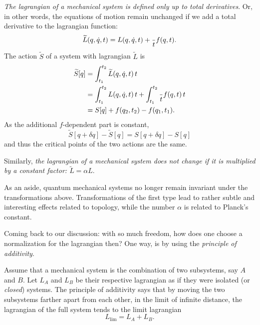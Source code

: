 \documentclass[english,fontsize=11pt,paper=a5,oneside]{scrbook}
\let\d\relax
\DeclareMathOperator{\d}{d}
\theoremstyle{definition}
\newenvironment{remark}
  {\pushQED{\qed}\renewcommand{\qedsymbol}{$\lozenge$}\remarkx}
  {\popQED\endremarkx}
\begin{document}
\begin{remark}\label{rmk:manylagrangians}
    \emph{The lagrangian of a mechanical system is defined only up to total derivatives}.
    Or, in other words, the equations of motion remain unchanged if we add a total derivative to the lagrangian function:
    \begin{equation}
        \widetilde L(q,\dot q, t) = L(q, \dot q, t) + \frac{\d}{\d t} f(q,t).
    \end{equation}
    The action $\widetilde S$ of a system with lagrangian $\widetilde L$ is
    \begin{align}
        \widetilde S[q] &= \int_{t_1}^{t_2} \widetilde L(q, \dot q, t) \,\d t \\
        &= \int_{t_1}^{t_2} L(q, \dot q, t) \,\d t + \int_{t_1}^{t_2} \frac{\d}{\d t} f(q,t) \,\d t \\
        &= S[q] + f(q_2, t_2) - f(q_1, t_1).
    \end{align}
    As the additional $f$-dependent part is constant,
    \begin{equation}
        \widetilde S[q+\delta q] - \widetilde S[q]
        = S[q+\delta q] - S[q]
    \end{equation}
    and thus the critical points of the two actions are the same.

    Similarly, \emph{the lagrangian of a mechanical system does not change if it is multiplied by a constant factor: $\widetilde L = \alpha L$}.

    As an aside, quantum mechanical systems no longer remain invariant under the transformations above. Transformations of the first type lead to rather subtle and interesting effects related to topology, while the number $\alpha$ is related to Planck's constant. 
    \end{remark}

    Coming back to our discussion: with so much freedom, how does one choose a normalization for the lagrangian then?
    One way, is by using the \emph{principle of additivity}.
    \begin{tcolorbox}
        Assume that a mechanical system is the combination of two subsystems, say $A$ and $B$.
        Let $L_A$ and $L_B$ be their respective lagrangian as if they were isolated (or \emph{closed}) systems.
        The principle of additivity says that by moving the two subsystems farther apart from each other, in the limit of infinite distance, the lagrangian of the full system tends to the limit lagrangian
        \begin{equation}
            L_{\lim} = L_A + L_B.
        \end{equation}
    \end{tcolorbox}
\end{document}
